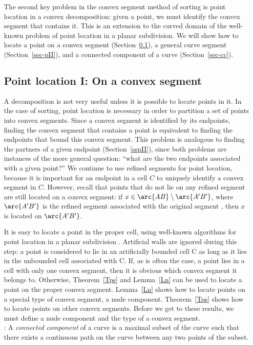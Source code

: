 The second key problem in the convex segment method of sorting is
point location in a convex decomposition: given a point, we must identify
the convex segment that contains it.
This is an extension to the curved domain of the well-known problem of point 
location in a planar subdivision. 
We will show how to locate a point on a convex segment (Section~\ref{sec-pI}), 
a general curve segment (Section~\ref{sec-pII}), and a connected component of a curve
(Section~\ref{sec-cc}).

\subsection{Point location I: On a convex segment}
\label{sec-pI}

A decomposition is not very useful unless it is possible to locate points in it. 
In the case of sorting, point location is necessary in order to partition a set of points
into convex segments.
Since a convex segment is identified by its endpoints, finding the convex 
segment that contains a point is equivalent to finding the endpoints that bound 
this convex segment.
This problem is analogous to finding the partners of a given
endpoint (Section~\ref{sspII}), since both problems are 
instances of the more general question: ``what are the two endpoints associated 
with a given point?''
We continue to use refined segments for point location, 
because it is important for 
an endpoint in a cell $C$ to uniquely identify a convex segment in $C$.
However, recall that points that do not lie on any refined segment are still located
on a convex segment: if $x \in \arc{AB} \setminus \arc{A'B'}$, where $\arc{A'B'}$ 
is the refined segment associated with the original segment , 
then $x$ is located on $\arc{A'B'}$.

It is easy to locate a point in the proper cell, using well-known algorithms 
for point location in a planar subdivision \cite{kirk,PS}.
Artificial walls are ignored during this step: a point
is considered to lie in an artificially bounded cell C as long as it lies
in the unbounded cell associated with C.
If, as is often the case, a point lies in a cell with only one convex segment, 
then it is obvious which convex segment it belongs to.
Otherwise, Theorem~\ref{Tps} and Lemma~\ref{Ln} can be used 
to locate a point on the proper convex segment.
Lemma~\ref{Ln} shows how to locate points on a special type of convex segment,
a nude component.
Theorem~\ref{Tps} shows how to locate points on other convex segments.
Before we get to these results, we must define a nude component and the type of
a convex segment.
\\[3pt]
%
:
A {\em connected component} of a curve is a maximal subset of the curve such that 
there exists a continuous path on the curve between any two points of the subset.

